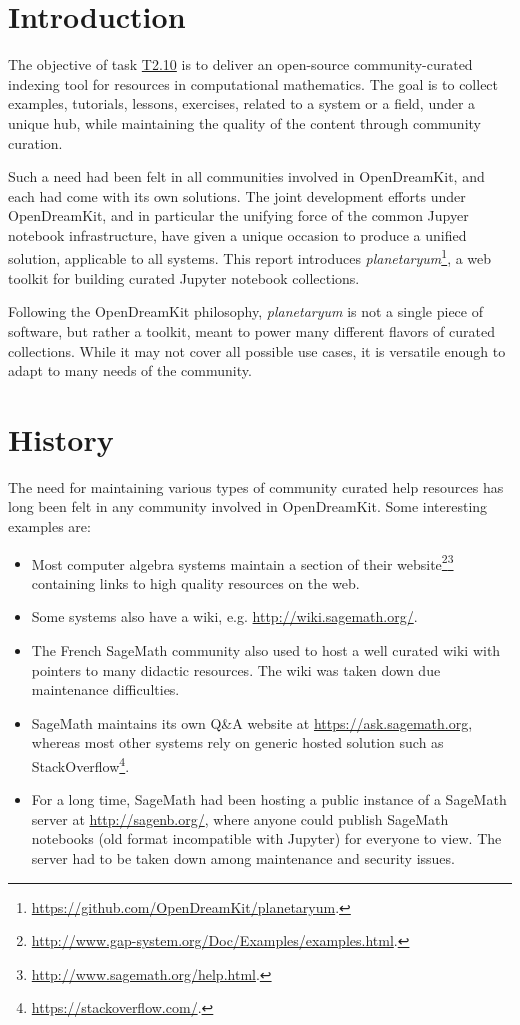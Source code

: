 \section{Introduction}\label{introduction}

The objective of task
\href{https://github.com/OpenDreamKit/OpenDreamKit/issues/33}{T2.10} is
to deliver an open-source community-curated indexing tool for resources
in computational mathematics. The goal is to collect examples,
tutorials, lessons, exercises, related to a system or a field, under a
unique hub, while maintaining the quality of the content through
community curation.

Such a need had been felt in all communities involved in OpenDreamKit,
and each had come with its own solutions. The joint development efforts
under OpenDreamKit, and in particular the unifying force of the common
Jupyer notebook infrastructure, have given a unique occasion to produce
a unified solution, applicable to all systems. This report introduces
\emph{planetaryum}\footnote{\url{https://github.com/OpenDreamKit/planetaryum}.},
a web toolkit for building curated Jupyter notebook collections.

Following the OpenDreamKit philosophy, \emph{planetaryum} is not a
single piece of software, but rather a toolkit, meant to power many
different flavors of curated collections. While it may not cover all
possible use cases, it is versatile enough to adapt to many needs of the
community.

\section{History}\label{history}

The need for maintaining various types of community curated help
resources has long been felt in any community involved in OpenDreamKit.
Some interesting examples are:

\begin{itemize}
\item
  Most computer algebra systems maintain a section of their
  website\footnote{\url{http://www.gap-system.org/Doc/Examples/examples.html}.}\footnote{\url{http://www.sagemath.org/help.html}.}
  containing links to high quality resources on the web.
\item
  Some systems also have a wiki, e.g. \url{http://wiki.sagemath.org/}.
\item
  The French SageMath community also used to host a well curated wiki
  with pointers to many didactic resources. The wiki was taken down due
  maintenance difficulties.
\item
  SageMath maintains its own Q\&A website at
  \url{https://ask.sagemath.org}, whereas most other systems rely on
  generic hosted solution such as StackOverflow\footnote{\url{https://stackoverflow.com/}.}.
\item
  For a long time, SageMath had been hosting a public instance of a
  SageMath server at \url{http://sagenb.org/}, where anyone could
  publish SageMath notebooks (old format incompatible with Jupyter) for
  everyone to view. The server had to be taken down among maintenance
  and security issues.
\end{itemize}

